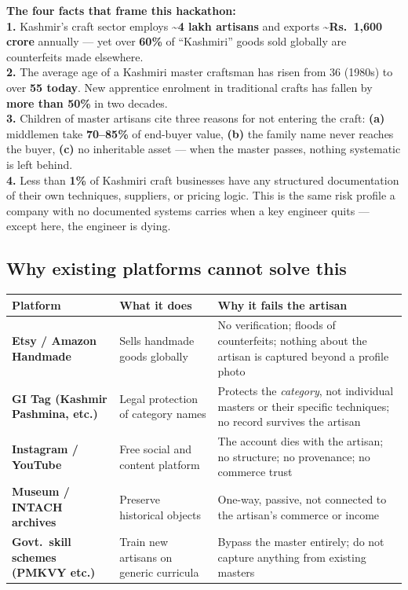 \documentclass[11pt, a4paper]{article}
\begin{document}
\begin{statbox}
\textbf{The four facts that frame this hackathon:}\\[4pt]
\textbf{1.} Kashmir's craft sector employs \textbf{\textasciitilde 4 lakh artisans} and exports \textbf{\textasciitilde Rs.\ 1{,}600 crore} annually --- yet over \textbf{60\%} of ``Kashmiri'' goods sold globally are counterfeits made elsewhere.\\[3pt]
\textbf{2.} The average age of a Kashmiri master craftsman has risen from 36 (1980s) to over \textbf{55 today}. New apprentice enrolment in traditional crafts has fallen by \textbf{more than 50\%} in two decades.\\[3pt]
\textbf{3.} Children of master artisans cite three reasons for not entering the craft: \textbf{(a)} middlemen take \textbf{70--85\%} of end-buyer value, \textbf{(b)} the family name never reaches the buyer, \textbf{(c)} no inheritable asset --- when the master passes, nothing systematic is left behind.\\[3pt]
\textbf{4.} Less than \textbf{1\%} of Kashmiri craft businesses have any structured documentation of their own techniques, suppliers, or pricing logic. This is the same risk profile a company with no documented systems carries when a key engineer quits --- except here, the engineer is dying.
\end{statbox}

\subsection{Why existing platforms cannot solve this}

\begin{center}
\small
\begin{tabularx}{\linewidth}{>{\bfseries}lXX}
\toprule
Platform & What it does & Why it fails the artisan \\
\midrule
Etsy / Amazon Handmade & Sells handmade goods globally & No verification; floods of counterfeits; nothing about the artisan is captured beyond a profile photo \\
GI Tag (Kashmir Pashmina, etc.) & Legal protection of category names & Protects the {\itshape category}, not individual masters or their specific techniques; no record survives the artisan \\
Instagram / YouTube & Free social and content platform & The account dies with the artisan; no structure; no provenance; no commerce trust \\
Museum / INTACH archives & Preserve historical objects & One-way, passive, not connected to the artisan's commerce or income \\
Govt.\ skill schemes (PMKVY etc.) & Train new artisans on generic curricula & Bypass the master entirely; do not capture anything from existing masters \\
\bottomrule
\end{tabularx}
\end{center}
\end{document}
